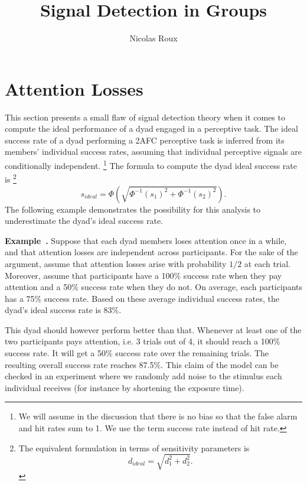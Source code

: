 \documentclass[12pt]{report}
\title{Signal Detection in Groups}
\author{Nicolas Roux}
\newcounter{example}[section]
\newenvironment{example}[1][]{\refstepcounter{example}\par\medskip
   \noindent \textbf{Example~\theexample. #1} \rmfamily}{\medskip}
\begin{document}
\maketitle

\chapter*{Attention Losses}
This section presents a small flaw of signal detection theory when it comes to compute the ideal performance of a dyad engaged in a perceptive task. The ideal success rate of a dyad performing a 2AFC perceptive task is inferred from its members' individual success rates, assuming that individual perceptive signals are conditionally independent. \footnote{We will assume in the discussion that there is no bias so that the false alarm and hit rates sum to 1. We use the term success rate instead of hit rate.} The formula to compute the dyad ideal success rate is \footnote{The equivalent formulation in terms of sensitivity parameters is $$ d_{ideal} = \sqrt{d_1^{2} + d_2^{2}}. $$} $$ s_{ideal} = \Phi(\sqrt{\Phi^{-1}(s_1)^2+\Phi^{-1}(s_2)^2}).$$ The following example demonstrates the possibility for this analysis to underestimate the dyad's ideal success rate.

\begin{example} \label{e1}
Suppose that each dyad members loses attention once in a while, and that attention losses are independent across participants. For the sake of the argument, assume that attention losses arise with probability $1/2$ at each trial. Moreover, assume that participants have a 100\% success rate when they pay attention and a 50\% success rate when they do not. On average, each participants has a 75\% success rate. Based on these average individual success rates, the dyad's ideal success rate is 83\%. 

This dyad should however perform better than that. Whenever at least one of the two participants pays attention, i.e. 3 trials out of 4, it should reach a 100\% success rate. It will get a 50\% success rate over the remaining trials. The resulting overall success rate reaches 87.5\%.
\end{example}
This claim of the model can be checked in an experiment where we randomly add noise to the stimulus each individual receives (for instance by shortening the exposure time). 
\end{document}
